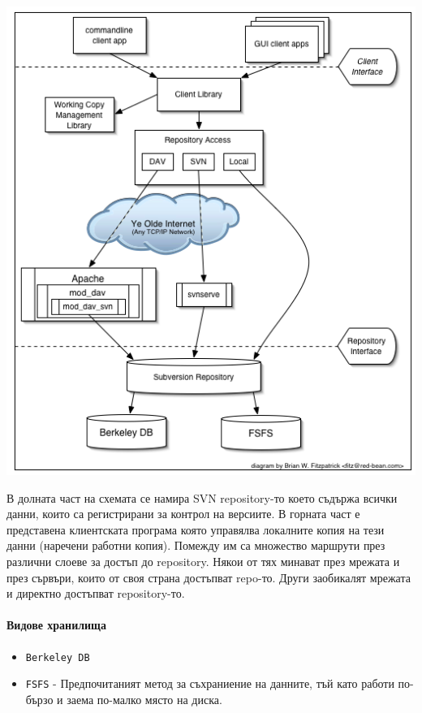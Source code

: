 \documentclass[a4paper]{article}
\begin{document}
    \includegraphics[scale=0.5]{svn_architecture}

    В долната част на схемата се намира SVN repository-то което съдържа всички данни, които са регистрирани за контрол на версиите. В горната част е представена клиентската програма която управялва локалните копия на тези данни (наречени работни копия). Помежду им са множество маршрути през различни слоеве за достъп до repository. Някои от тях минават през мрежата и през сървъри, които от своя страна достъпват repo-то. Други заобикалят мрежата и директно достъпват repository-то.

    \paragraph{Видове хранилища}

    \begin{itemize}
      \item \texttt{Berkeley DB}
      \item \texttt{FSFS} - Предпочитаният метод за съхраниение на данните, тъй като работи по-бързо и заема по-малко място на диска.
    \end{itemize}
\end{document}
